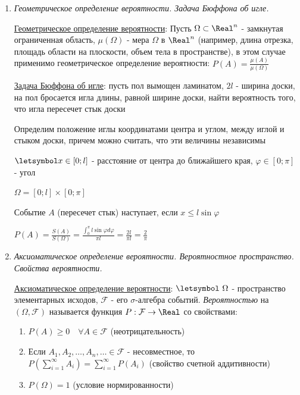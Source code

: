 \documentclass[12pt]{article}
\begin{document}
\begin{enumerate}
    \item \textit{Геометрическое определение вероятности. Задача Бюффона об игле.}

    \hyperlink{geometricdefinitionofprobability}{Геометрическое определение вероятности}: Пусть $\Omega \subset \Real^n$ - замкнутая ограниченная область,
    $\mu(\Omega)$ - мера $\Omega$ в $\Real^n$ (например, длина отрезка, площадь области на плоскости, объем тела в пространстве), в этом случае применимо геометрическое определение вероятности: $P(A) = \frac{\mu(A)}{\mu(\Omega)}$

    \hyperlink{buffonsproblem}{Задача Бюффона об игле}: пусть пол вымощен ламинатом, $2l$ - ширина доски, на пол бросается игла длины, равной ширине доски,
    найти вероятность того, что игла пересечет стык доски

    Определим положение иглы координатами центра и углом, между иглой и стыком доски, причем можно считать, что эти величины независимы

    $\letsymbol x \in [0; l]$ - расстояние от центра до ближайшего края, $\varphi \in [0; \pi]$ - угол

    $\Omega = [0; l] \times [0; \pi]$

    Событие $A$ (пересечет стык) наступает, если $x \leq l \sin \varphi$

    $P(A) = \frac{S(A)}{S(\Omega)} = \frac{\int_0^\pi l \sin \varphi d \varphi}{\pi l} = \frac{2l}{\pi l} = \frac{2}{\pi}$

    \item \textit{Аксиоматическое определение вероятности. Вероятностное пространство. Свойства вероятности.}

    \hyperlink{axiomaticdefinitionofprobability}{Аксиоматическое определение вероятности}: $\letsymbol\ \Omega$ - пространство элементарных исходов, $\mathcal{F}$ - его $\sigma$-алгебра событий.
    \textit{Вероятностью} на $(\Omega, \mathcal{F})$ называется функция $P: \mathcal{F} \to \Real$ со свойствами:

    \begin{enumerate}
        \item $P(A) \geq 0 \quad \forall A \in \mathcal{F}$ (неотрицательность)

        \item Если $A_1, A_2, \dots, A_n, \dots \in \mathcal{F}$ - несовместное, то $P(\sum_{i = 1}^\infty A_i) = \sum_{i = 1}^\infty P(A_i)$ (свойство счетной аддитивности)

        \item $P(\Omega) = 1$ (условие нормированности)
    \end{enumerate}


\end{enumerate}
\end{document}
